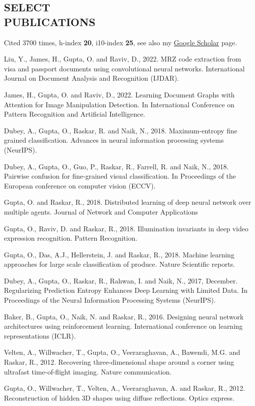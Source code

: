 \documentclass[margin, 10pt]{res} %
\begin{document}
\begin{resume}
\section{SELECT\\PUBLICATIONS}
Cited 3700 times, h-index  \textbf{20}, i10-index  \textbf{25}, see also my  \href{https://scholar.google.com/citations?hl=en&user=2aEdHz0AAAAJ&view_op=list_works}{Google Scholar} page. \\
\begin{etaremune}[start=27]
\item Liu, Y., James, H., Gupta, O. and Raviv, D., 2022. MRZ code extraction from visa and passport documents using convolutional neural networks. International Journal on Document Analysis and Recognition (IJDAR).
\item James, H., Gupta, O. and Raviv, D., 2022. Learning Document Graphs with Attention for Image Manipulation Detection. In International Conference on Pattern Recognition and Artificial Intelligence.
\item Dubey, A., Gupta, O., Raskar, R. and Naik, N., 2018. Maximum-entropy fine grained classification. Advances in neural information processing systems (NeurIPS).
\item Dubey, A., Gupta, O., Guo, P., Raskar, R., Farrell, R. and Naik, N., 2018. Pairwise confusion for fine-grained visual classification. In Proceedings of the European conference on computer vision (ECCV).
\item Gupta, O. and Raskar, R., 2018. Distributed learning of deep neural network over multiple agents. Journal of Network and Computer Applications
\item Gupta, O., Raviv, D. and Raskar, R., 2018. Illumination invariants in deep video expression recognition. Pattern Recognition.
\item Gupta, O., Das, A.J., Hellerstein, J. and Raskar, R., 2018. Machine learning approaches for large scale classification of produce. Nature Scientific reports.
\item Dubey, A., Gupta, O., Raskar, R., Rahwan, I. and Naik, N., 2017, December. Regularizing Prediction Entropy Enhances Deep Learning with Limited Data. In Proceedings of the Neural Information Processing Systems (NeurIPS).
\item Baker, B., Gupta, O., Naik, N. and Raskar, R., 2016. Designing neural network architectures using reinforcement learning. International conference on learning representations (ICLR).
\item Velten, A., Willwacher, T., Gupta, O., Veeraraghavan, A., Bawendi, M.G. and Raskar, R., 2012. Recovering three-dimensional shape around a corner using ultrafast time-of-flight imaging. Nature communication.
\item Gupta, O., Willwacher, T., Velten, A., Veeraraghavan, A. and Raskar, R., 2012. Reconstruction of hidden 3D shapes using diffuse reflections. Optics express.
\end{etaremune}

\end{resume}
\end{document}
